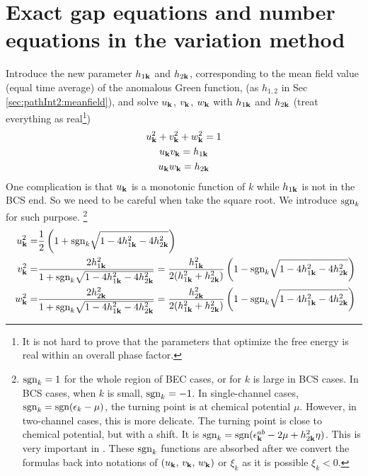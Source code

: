  \section{Exact gap equations and number equations in the variation method}
Introduce the new parameter $h_{1\mathbf{k}}$ and $h_{2\mathbf{k}}$, corresponding to the mean field value (equal time average) of the anomalous Green function,  (as $h_{1,2}$  in Sec \ref{sec:pathInt2:meanfield}), and solve $u_{\mathbf{k}}$, $v_{\mathbf{k}}$, $w_{\mathbf{k}}$ with $h_{1\mathbf{k}}$ and $h_{2\mathbf{k}}$ (treat everything as real\footnote{It is not hard to prove that the parameters that optimize the free energy is real within an overall phase factor. })
\begin{gather}
u_{\mathbf{k}}^2+v^{2}_{\mathbf{k}}+w^{2}_{\mathbf{k}}=1\\
u_{\mathbf{k}}v_{\mathbf{k}}=h_{1\mathbf{k}}\\
u_{\mathbf{k}}w_{\mathbf{k}}=h_{2\mathbf{k}}
\end{gather}
One complication is that $u_{\mathbf{k}}$ is a monotonic function of $k$ while $h_{1\mathbf{k}}$ is not in the BCS end.  So we need to be careful when take the square root.  We introduce $\text{sgn}_k$ for such purpose.  \footnote{\label{foot:20100909:sgn} $\text{sgn}_k=1$  for the whole region of BEC cases, or for $k$ is large in BCS cases. In BCS cases, when $k$ is small, $\text{sgn}_{k}=-1$.  In single-channel cases, $\text{sgn}_{k}=\text{sgn}(\epsilon_{k}-\mu)$, the turning point is at chemical potential $\mu$.  However, in two-channel cases, this is more delicate.  The turning point is close to chemical potential, but with a shift. It is $\text{sgn}_k=\text{sgn}(\epsilon^{ab}_{\mathbf{k}}-2\mu+  h_{2\mathbf{k}}^2\eta)$.  This is very important in .  These $\text{sgn}_{k}$ functions are absorbed after we convert the formulas back into notations of  $(u_{\mathbf{k}},\,v_{\mathbf{k}}, \,w_{\mathbf{k}})$ or $\xi_{k}$ as it is possible $\xi_{k}<0$.}
\begin{equation}
\begin{split}
u_{\mathbf{k}}^2=&\frac{1}{2} \left(1+\text{sgn}_{k}\sqrt{1-4 h_{1\mathbf{k}}^2-4 h_{2\mathbf{k}}^2}\right)\\
v^{2}_{\mathbf{k}}=&\frac{2 h_{1\mathbf{k}}^2}{1+\text{sgn}_{k}\sqrt{1-4 h_{1\mathbf{k}}^2-4 h_{2\mathbf{k}}^2}}
=\frac{ h_{1\mathbf{k}}^2}{2( h_{1\mathbf{k}}^2+ h_{2\mathbf{k}}^2)} \left(1-\text{sgn}_{k}\sqrt{1-4 h_{1\mathbf{k}}^2-4 h_{2\mathbf{k}}^2}\right)\\\
w^{2}_{\mathbf{k}}=&\frac{2 h_{2\mathbf{k}}^2}{1+\text{sgn}_{k}\sqrt{1-4 h_{1\mathbf{k}}^2-4 h_{2\mathbf{k}}^2}}
=\frac{h_{2\mathbf{k}}^2}{2( h_{1\mathbf{k}}^2+ h_{2\mathbf{k}}^2)} \left(1-\text{sgn}_{k}\sqrt{1-4 h_{1\mathbf{k}}^2-4 h_{2\mathbf{k}}^2}\right)
\end{split}
\end{equation}

